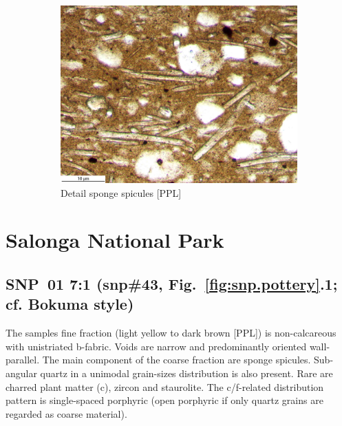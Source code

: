 \documentclass[a4paper]{article}
\begin{document}
\begin{figure}[H]
\begin{subfigure}[t]{.49\textwidth}
		\includegraphics[width=\textwidth]{ThinSections/49-2_20x_PPL.jpg}
		\caption{Detail sponge spicules [PPL]}
	\end{subfigure}\hspace{.5em}\hfill
	\caption{}
	\label{fig:49_waf}
\end{figure}

\newpage\section{Salonga National Park}

\subsection{SNP~01 7:1 (snp\#43, Fig.~\ref{fig:snp.pottery}.1; cf. Bokuma style)}

\begin{multicols}{2}
\noindent The samples fine fraction (light yellow to dark brown [PPL]) is non-calcareous with unistriated b-fabric. Voids are narrow and predominantly oriented wall-parallel. The main component of the coarse fraction are sponge spicules. Sub-angular quartz in a unimodal grain-sizes distribution is also present. Rare are charred plant matter (c), zircon and staurolite. The c/f-related distribution pattern is single-spaced porphyric (open porphyric if only quartz grains are regarded as coarse material).
\end{multicols}
\end{document}
